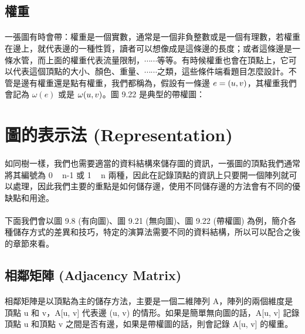 \documentclass[12pt,a4paper,oneside]{report}
\begin{document}
\begin{CJK}{UTF8}{bkai}
\subsection{權重}
\paragraph{}一張圖有時會帶\textbf{}：權重是一個實數，通常是一個非負整數或是一個有理數，若權重在邊上，就代表邊的一種性質，讀者可以想像成是這條邊的長度；或者這條邊是一條水管，而上面的權重代表流量限制，$\cdots\cdots$等等。有時候權重也會在頂點上，它可以代表這個頂點的大小、顏色、重量、$\cdots\cdots$之類，這些條件端看題目怎麼設計。不管是邊有權重還是點有權重，我們都稱為\textbf{}，假設有一條邊 $e=({u},{v})$，其權重我們會記為 $\omega{(e)}$ 或是 $\omega{\ensuremath{({u},{v})}}$。圖 9.22 是典型的帶權圖：

\section{圖的表示法 (Representation)}

\paragraph{}如同樹一樣，我們也需要適當的資料結構來儲存圖的資訊，一張圖的頂點我們通常將其編號為 0 ~ n-1 或 1 ~ n 兩種，因此在記錄頂點的資訊上只要開一個陣列就可以處理，因此我們主要的重點是如何儲存邊，使用不同儲存邊的方法會有不同的優缺點和用途。
\paragraph{}下面我們會以圖 9.8 (有向圖)、圖 9.21 (無向圖)、圖 9.22 (帶權圖) 為例，簡介各種儲存方式的差異和技巧，特定的演算法需要不同的資料結構，所以可以配合之後的章節來看。

\subsection{相鄰矩陣 (Adjacency Matrix)}

\paragraph{}相鄰矩陣是以頂點為主的儲存方法，主要是一個二維陣列 A，陣列的兩個維度是頂點 u 和 v，A[u, v] 代表邊 (u, v) 的情形。如果是簡單無向圖的話，A[u, v] 記錄頂點 u 和頂點 v 之間是否有邊，如果是帶權圖的話，則會記錄 A[u, v] 的權重。

\end{CJK}
\end{document}
